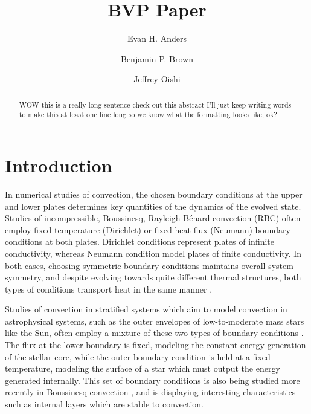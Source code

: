 \documentclass[aps, pre, onecolumn, nofootinbib, notitlepage, groupedaddress, amsfonts, amssymb, amsmath, longbibliography]{revtex4-1}
\newcommand{\RB}{Rayleigh-B\'{e}nard }
\begin{document}
\author{Evan H. Anders}
\author{Benjamin P. Brown}
\author{Jeffrey Oishi}
\title{BVP Paper}

\begin{abstract}
WOW this is a really long sentence check out this abstract I'll just keep writing words to make this at least
one line long so we know what the formatting looks like, ok?
\end{abstract}
\maketitle


\section{Introduction}
\label{sec:intro}
In numerical studies of convection, the chosen boundary conditions at the upper and lower plates
determines key quantities of the dynamics of the evolved state.
Studies of incompressible, Boussinesq, \RB convection (RBC) often
employ fixed temperature (Dirichlet) or fixed heat flux
(Neumann) boundary conditions at both plates.  
Dirichlet conditions represent plates of infinite conductivity,
whereas Neumann condition model plates of finite conductivity.  
In both cases, choosing symmetric boundary conditions maintains overall system symmetry, 
and despite evolving towards quite different thermal structures, both types of conditions
transport heat in the same manner \cite{johnston&doering2009}.

Studies of convection in stratified systems which aim to model convection 
in astrophysical systems, such as the outer envelopes of low-to-moderate mass stars 
like the Sun, often employ a mixture of these
two types of boundary conditions \cite{hurlburt&all1984, cattaneo&all1991}.  
The flux at the lower boundary is fixed, modeling
the constant energy generation of the stellar core, 
while the outer boundary condition is held at a fixed temperature,
modeling the surface of a star which must output the energy generated internally.
This set of boundary conditions is also being studied more recently in Boussinesq convection
\cite{korre&all2017}, and is displaying interesting characteristics such as internal layers which
are stable to convection.
\end{document}
